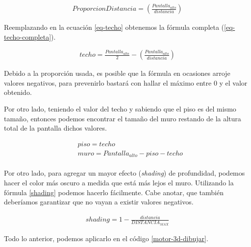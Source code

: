 \begin{equation}
\begin{aligned}
\label{eq-propdist}
ProporcionDistancia = \left(\frac{Pantalla_{alto}}{distancia}\right)
\end{aligned}
\end{equation}

Reemplazando en la ecuación \ref{eq-techo} obtenemos la fórmula completa (\ref{eq-techo-completa}).

\begin{equation}
\begin{aligned}
\label{eq-techo-completa}
techo = \frac{Pantalla_{alto}}{2} - \left(\frac{Pantalla_{alto}}{distancia}\right)
\end{aligned}
\end{equation}


Debido a la proporción usada, es posible que la fórmula en ocasiones arroje valores negativos, para prevenirlo bastará con hallar el máximo entre 0 y el valor obtenido.

Por otro lado, teniendo el valor del techo y sabiendo que el piso es del mismo tamaño, entonces podemos encontrar el tamaño del muro restando de la altura total de la pantalla dichos valores.

\begin{equation}
\begin{aligned}
\label{eq-muros}
& piso = techo \\
& muro = Pantalla_{alto} - piso - techo \\
\end{aligned}
\end{equation}


Por otro lado, para agregar un mayor efecto (\emph{shading}) de profundidad, podemos hacer el color más oscuro a medida que está más lejos el muro. Utilizando la fórmula \ref{shading} podemos hacerlo fácilmente. Cabe anotar, que también deberíamos garantizar que no vayan a existir valores negativos.

\begin{equation}
\begin{aligned}
\label{eq-techo-completa}
shading = 1 - \frac{distancia}{DISTANCIA_{MAX}}
\end{aligned}
\end{equation}

Todo lo anterior, podemos aplicarlo en el código \ref{motor-3d-dibujar}.



